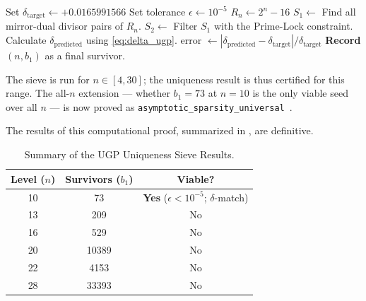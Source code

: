 \documentclass[11pt,twocolumn]{article}
\theoremstyle{remark}
\begin{document}
\begin{algorithm}[H]
\caption{UGP Uniqueness Sieve}
\label{alg:sieve}
\begin{algorithmic}[1]
\State Set $\delta_{\text{target}} \gets +0.0165991566$  
\State Set tolerance $\epsilon \gets 10^{-5}$  
    \State $R_n \gets 2^n - 16$
    \State $S_1 \gets$ Find all mirror-dual divisor pairs of $R_n$.
    \State $S_2 \gets$ Filter $S_1$ with the Prime-Lock constraint.
        \State Calculate $\delta_{\text{predicted}}$ using \cref{eq:delta_ugp}.
        \State error $\gets |\delta_{\text{predicted}} - \delta_{\text{target}}| / \delta_{\text{target}}$
            \State \textbf{Record} $(n, b_1)$ as a final survivor.
        \EndIf
    \EndFor
\EndFor
\end{algorithmic}
\end{algorithm}

The sieve is run for $n\in[4,30]$; the uniqueness result is thus certified for this range. The all-$n$ extension --- whether $b_1=73$ at $n=10$ is the only viable seed over all $n$ --- is now proved as \texttt{asymptotic\_sparsity\_universal}~\cite{Spivack2026_Uniqueness25}.

The results of this computational proof, summarized in , are definitive.

\begin{table}[h!]
    \centering
    \caption{Summary of the UGP Uniqueness Sieve Results.}
    \label{tab:sieve_results}
    \renewcommand{\arraystretch}{1.2}
    \small
    \begin{tabular}{@{}ccc@{}}
        \toprule
        \textbf{Level ($n$)} & \textbf{Survivors ($b_1$)} & \textbf{Viable?} \\
        \midrule
        10 & 73 & \textbf{Yes} ($\epsilon < 10^{-5}$; $\delta$-match) \\
        13 & 209 & No \\
        16 & 529 & No \\
        20 & 10389 & No \\
        22 & 4153 & No \\
        28 & 33393 & No \\
        \bottomrule
    \end{tabular}
\end{table}
\end{document}
